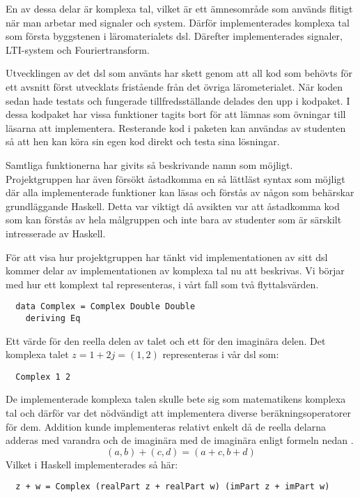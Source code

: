 \documentclass[12pt,a4paper,twoside,openright]{article}
\begin{document}
En av dessa delar är komplexa tal, vilket är ett ämnesområde som
används flitigt när man arbetar med signaler och system. Därför
implementerades komplexa tal som första byggstenen i läromaterialets
\gls{dsl}. Därefter implementerades signaler, LTI-system och
Fouriertransform.

Utvecklingen av det \gls{dsl} som använts har skett genom att all kod
som behövts för ett avsnitt först utvecklats fristående från det
övriga lärometerialet. När koden sedan hade testats och fungerade
tillfredsställande delades den upp i kodpaket. I dessa kodpaket har
vissa funktioner tagits bort för att lämnas som övningar till läsarna
att implementera. Resterande kod i paketen kan användas av studenten
så att hen kan köra sin egen kod direkt och testa sina lösningar.

Samtliga funktionerna har givits så beskrivande namn som
möjligt. Projektgruppen har även försökt åstadkomma en så lättläst
syntax som möjligt där alla implementerade funktioner kan läsas och
förstås av någon som behärskar grundläggande Haskell. Detta var
viktigt då avsikten var att åstadkomma kod som kan förstås av hela
målgruppen och inte bara av studenter som är särskilt intresserade av
Haskell.

För att visa hur projektgruppen har tänkt vid implementationen av sitt
\gls{dsl} kommer delar av implementationen av komplexa tal nu att
beskrivas. Vi börjar med hur ett komplext tal representeras, i vårt
fall som två flyttalsvärden.
\begin{verbatim}
  data Complex = Complex Double Double
    deriving Eq
\end{verbatim}
Ett värde för den reella delen av talet och ett för den imaginära
delen. Det komplexa talet \(z = 1 + 2j = (1,2) \) representeras i vår
\gls{dsl} som:
\begin{verbatim}
  Complex 1 2
\end{verbatim}
De implementerade komplexa talen skulle bete sig som matematikens
komplexa tal och därför var det nödvändigt att implementera diverse
beräkningsoperatorer för dem. Addition kunde implementeras relativt
enkelt då de reella delarna adderas med varandra och de imaginära med
de imaginära enligt formeln nedan \cite{conway1978functions}.
\[(a, b) + (c, d) = (a + c, b + d)\]
Vilket i Haskell implementerades så här:
\begin{verbatim}
  z + w = Complex (realPart z + realPart w) (imPart z + imPart w)
\end{verbatim}
\end{document}
